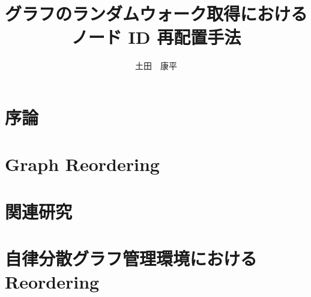 \documentclass[12pt]{b-thesis}
\begin{document}
\title{グラフのランダムウォーク取得における\\ノード ID 再配置手法}
\titleinenglish{}
\subteacher{}
\courseinenglish{}
\author{土田　康平}
\maketitle

\courseinenglish{}
\authorinenglish{}
\titleinenglish{}



\makejabstract

\clearpage


\setcounter{page}{1}

\tableofcontents
\thispagestyle{plain}

\listoffigures
\listoftables

\clearpage


\pagestyle{headings}
\setcounter{page}{1}

\clearpage

\chapter{序論}
\label{chap:introduction}


\chapter{Graph Reordering}
\label{chap:existing_technology}


\chapter{関連研究}
\label{chap:related_research}


\chapter{自律分散グラフ管理環境における Reordering}
\label{chap:design}


\begin{comment}
\chapter{プロトコル詳細}
\label{chap:protocol}

\end{comment}
\end{document}

